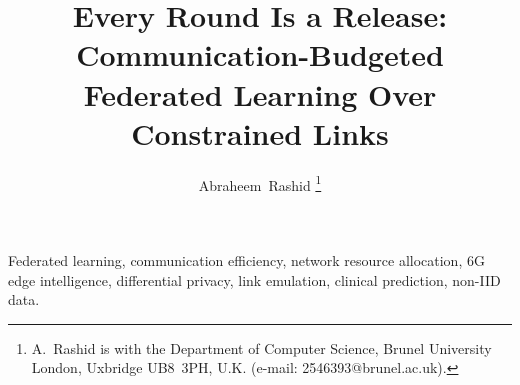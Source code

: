 \documentclass[journal]{IEEEtran}
\begin{document}

\title{Every Round Is a Release: Communication-Budgeted Federated Learning Over Constrained Links}

\author{Abraheem~Rashid
\thanks{A.~Rashid is with the Department of Computer Science, Brunel University London, Uxbridge UB8~3PH, U.K. (e-mail: 2546393@brunel.ac.uk).}}


\maketitle



\begin{IEEEkeywords}
Federated learning, communication efficiency, network resource allocation, 6G edge intelligence, differential privacy, link emulation, clinical prediction, non-IID data.
\end{IEEEkeywords}











\end{document}
